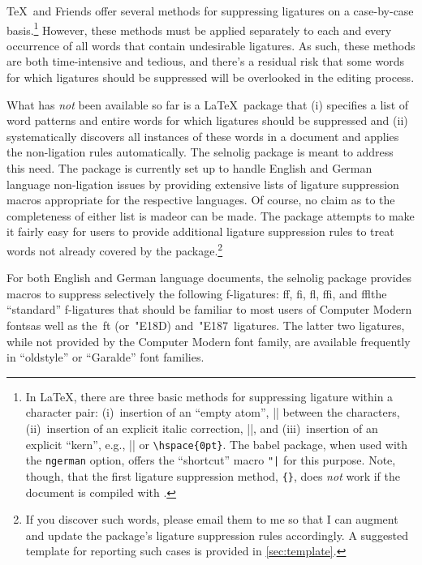 \documentclass[12pt]{article}
\newcommand{\pkg}[1]{\textsf{#1}}
\newcommand{\opt}[1]{\texttt{#1}}
\begin{document}
\TeX\ and Friends offer several methods for suppressing ligatures on a case-by-case basis.\footnote{In \LaTeX, there are three basic methods for suppressing ligature within a character pair: (i)~insertion of an \enquote{empty atom}, |{}| between the characters, (ii)~insertion of an explicit italic correction, |\/|, and (iii)~insertion of an explicit \enquote{kern}, e.g., |\kern0pt| or \Verb/\hspace{0pt}/. The \pkg{babel} package, when used with the \opt{ngerman} option, offers the \enquote{shortcut} macro \Verb/"|/ for this purpose. Note, though, that the first ligature suppression method, \Verb/{}/, does \emph{not} work if the document is compiled with \LuaLaTeX.} However, these methods must be applied separately to each and every occurrence of all words that contain undesirable ligatures. As such, these methods are both time-intensive and tedious, and there's a residual risk that some words for which ligatures should be suppressed will be overlooked in the editing process. 

What has \emph{not} been available so far is a \LaTeX\ package that (i) specifies a list of word patterns and entire words for which ligatures should be suppressed and (ii) systematically discovers all instances of these words in a document and applies the non-ligation rules automatically. The \pkg{selnolig} package is meant to address this need. The package is currently set up to handle English and German language non-ligation issues by providing extensive lists of ligature suppression macros appropriate for the respective languages. Of course, no claim as to the completeness of either list is made\textemdash or can be made. The package attempts to make it fairly easy for users to provide additional ligature suppression rules to treat words not already covered by the package.\footnote{If you discover such words, please email them to me so that I can augment and update the package's ligature suppression rules accordingly. A suggested template for reporting such cases is provided in \cref{sec:template}.} 

For both English and German language documents, the \pkg{selnolig} package provides macros to suppress selectively the following f-ligatures: ff, fi, fl, ffi, and ffl\textemdash the \enquote{standard} f-ligatures that should be familiar to most users of Computer Modern fonts\textemdash as well as the~ft (or~\char"E18D) and~\char"E187\ ligatures. The latter two ligatures, while not provided by the Computer Modern font family, are available frequently in \enquote{oldstyle} or \enquote{Garalde} font families.
\end{document}
